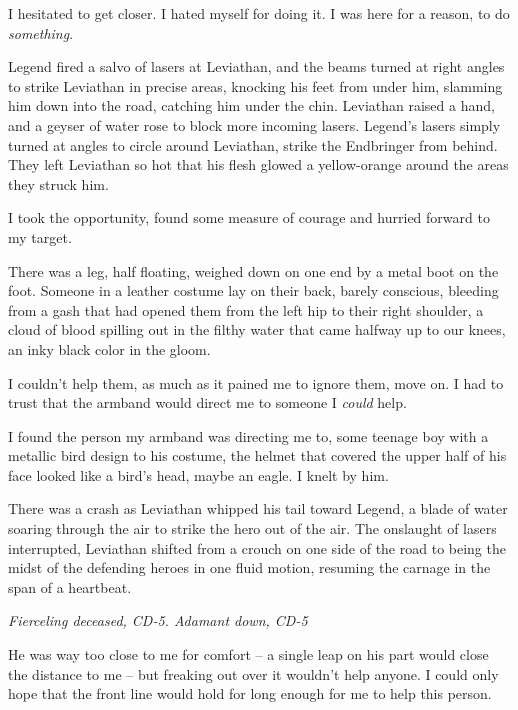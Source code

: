 I hesitated to get closer.  I hated myself for doing it.  I was here for a reason, to do \emph{something}.



Legend fired a salvo of lasers at Leviathan, and the beams turned at right angles to strike Leviathan in precise areas, knocking his feet from under him, slamming him down into the road, catching him under the chin.  Leviathan raised a hand, and a geyser of water rose to block more incoming lasers.  Legend's lasers simply turned at angles to circle around Leviathan, strike the Endbringer from behind.  They left Leviathan so hot that his flesh glowed a yellow-orange around the areas they struck him.



I took the opportunity, found some measure of courage and hurried forward to my target.



There was a leg, half floating, weighed down on one end by a metal boot on the foot.  Someone in a leather costume lay on their back, barely conscious, bleeding from a gash that had opened them from the left hip to their right shoulder, a cloud of blood spilling out in the filthy water that came halfway up to our knees, an inky black color in the gloom.



I couldn't help them, as much as it pained me to ignore them, move on.  I had to trust that the armband would direct me to someone I \emph{could} help.



I found the person my armband was directing me to, some teenage boy with a metallic bird design to his costume, the helmet that covered the upper half of his face looked like a bird's head, maybe an eagle.  I knelt by him.



There was a crash as Leviathan whipped his tail toward Legend, a blade of water soaring through the air to strike the hero out of the air.  The onslaught of lasers interrupted, Leviathan shifted from a crouch on one side of the road to being the midst of the defending heroes in one fluid motion, resuming the carnage in the span of a heartbeat.



\emph{Fierceling deceased, CD-5.  Adamant down, CD-5}



He was way too close to me for comfort – a single leap on his part would close the distance to me – but freaking out over it wouldn't help anyone.  I could only hope that the front line would hold for long enough for me to help this person.



